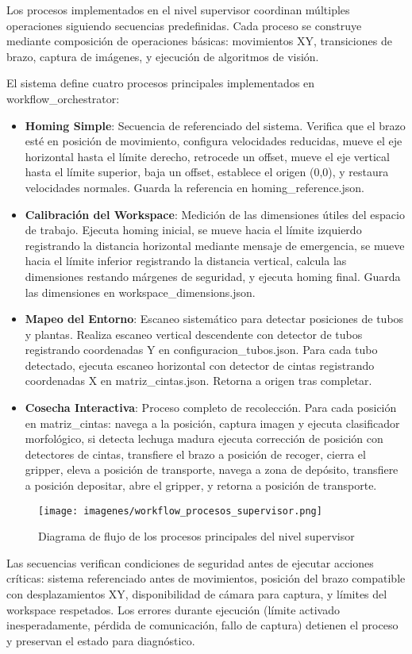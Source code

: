 Los procesos implementados en el nivel supervisor coordinan múltiples operaciones siguiendo secuencias predefinidas. Cada proceso se construye mediante composición de operaciones básicas: movimientos XY, transiciones de brazo, captura de imágenes, y ejecución de algoritmos de visión.

El sistema define cuatro procesos principales implementados en workflow\_orchestrator:

\begin{itemize}[label=$\bullet$]
    \item \textbf{Homing Simple}: Secuencia de referenciado del sistema. Verifica que el brazo esté en posición de movimiento, configura velocidades reducidas, mueve el eje horizontal hasta el límite derecho, retrocede un offset, mueve el eje vertical hasta el límite superior, baja un offset, establece el origen (0,0), y restaura velocidades normales. Guarda la referencia en homing\_reference.json.

    \item \textbf{Calibración del Workspace}: Medición de las dimensiones útiles del espacio de trabajo. Ejecuta homing inicial, se mueve hacia el límite izquierdo registrando la distancia horizontal mediante mensaje de emergencia, se mueve hacia el límite inferior registrando la distancia vertical, calcula las dimensiones restando márgenes de seguridad, y ejecuta homing final. Guarda las dimensiones en workspace\_dimensions.json.

    \item \textbf{Mapeo del Entorno}: Escaneo sistemático para detectar posiciones de tubos y plantas. Realiza escaneo vertical descendente con detector de tubos registrando coordenadas Y en configuracion\_tubos.json. Para cada tubo detectado, ejecuta escaneo horizontal con detector de cintas registrando coordenadas X en matriz\_cintas.json. Retorna a origen tras completar.

    \item \textbf{Cosecha Interactiva}: Proceso completo de recolección. Para cada posición en matriz\_cintas: navega a la posición, captura imagen y ejecuta clasificador morfológico, si detecta lechuga madura ejecuta corrección de posición con detectores de cintas, transfiere el brazo a posición de recoger, cierra el gripper, eleva a posición de transporte, navega a zona de depósito, transfiere a posición depositar, abre el gripper, y retorna a posición de transporte.
\end{itemize}

\begin{figure}[H]
    \centering
    \texttt{[image: imagenes/workflow\_procesos\_supervisor.png]}
    \caption{Diagrama de flujo de los procesos principales del nivel supervisor}
    \label{fig:workflow_procesos_supervisor}
\end{figure}

Las secuencias verifican condiciones de seguridad antes de ejecutar acciones críticas: sistema referenciado antes de movimientos, posición del brazo compatible con desplazamientos XY, disponibilidad de cámara para captura, y límites del workspace respetados. Los errores durante ejecución (límite activado inesperadamente, pérdida de comunicación, fallo de captura) detienen el proceso y preservan el estado para diagnóstico.